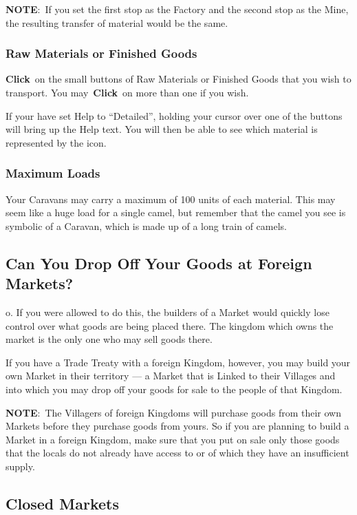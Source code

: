 \textbf{NOTE}: If you set the first stop as the Factory and the second stop as the Mine, the resulting transfer of material would be the same.

\subsubsection{Raw Materials or Finished Goods}

\textbf{Click} on the small buttons of Raw Materials or Finished Goods that you wish to transport. You may \textbf{Click} on more than one if you wish.

If your have set Help to “Detailed”, holding your cursor over one of the buttons will bring up the Help text. You will then be able to see which material is represented by the icon.

\subsubsection{Maximum Loads}

Your Caravans may carry a maximum of 100 units of each material. This may seem like a huge load for a single camel, but remember that the camel you see is symbolic of a Caravan, which is made up of a long train of camels.

\subsection{Can You Drop Off Your Goods at Foreign Markets?}


o. If you were allowed to do this, the builders of a Market would quickly lose control over what goods are being placed there. The kingdom which owns the market is the only one who may sell goods there.

If you have a Trade Treaty with a foreign Kingdom, however, you may build your own Market in their territory --- a Market that is Linked to their Villages and into which you may drop off your goods for sale to the people of that Kingdom.

\textbf{NOTE}: The Villagers of foreign Kingdoms will purchase goods from their own Markets before they purchase goods from yours. So if you are planning to build a Market in a foreign Kingdom, make sure that you put on sale only those goods that the locals do not already have access to or of which they have an insufficient supply.

\subsection{Closed Markets}

